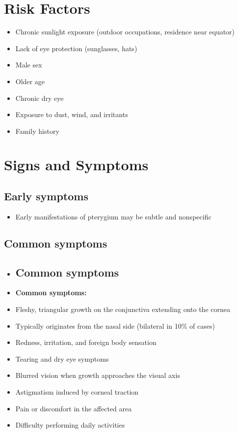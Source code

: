 \section{Risk Factors}

\begin{itemize}[noitemsep]
  \item Chronic sunlight exposure (outdoor occupations, residence near equator)
  \item Lack of eye protection (sunglasses, hats)
  \item Male sex
  \item Older age
  \item Chronic dry eye
  \item Exposure to dust, wind, and irritants
  \item Family history
\end{itemize}

\section{Signs and Symptoms}

\subsection{Early symptoms}
\begin{itemize}[noitemsep]
  \item Early manifestations of pterygium may be subtle and nonspecific
\end{itemize}

\subsection{Common symptoms}
\begin{itemize}[noitemsep]
  \item \subsection{Common symptoms}
  \item \textbf{Common symptoms:}
  \item Fleshy, triangular growth on the conjunctiva extending onto the cornea
  \item Typically originates from the nasal side (bilateral in 10\% of cases)
  \item Redness, irritation, and foreign body sensation
  \item Tearing and dry eye symptoms
  \item Blurred vision when growth approaches the visual axis
  \item Astigmatism induced by corneal traction
  \item Pain or discomfort in the affected area
  \item Difficulty performing daily activities
\end{itemize}

